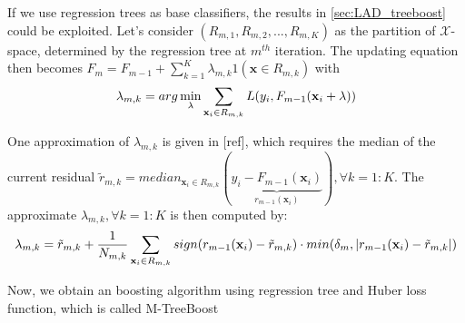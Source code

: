 \documentclass[a4paper,twoside,12pt]{article}
\begin{document}
If we use regression trees as base classifiers, the results in \ref{sec:LAD_treeboost} could be exploited. 
Let's consider $(R_{m,1}, R_{m,2},..., R_{m,K})$ as the partition of $\mathcal{X}$-space, determined by the regression tree at $m^{th}$ iteration. The updating equation then becomes $F_m = F_{m-1} + \sum\limits_{k=1}^{K}{\lambda_{m,k}1(\textbf{x}\in{R_{m,k}})}$ with
\begin{align}
	\lambda_{m,k} =arg\min\limits_{\lambda}\sum\limits_{\textbf{x}_i\in{R_{m,k}}}{L(y_i, F_{m-1}(\textbf{x}_i + \lambda))} \notag
\end{align}

One approximation of $\lambda_{m,k}$ is given in [ref], which requires the median of the current residual $\tilde{r}_{m,k} = median_{\textbf{x}_i\in{R_{m,k}}}(\underbrace{y_i - F_{m-1}(\textbf{x}_i)}_{r_{m-1}(\textbf{x}_i)}), \forall{k}=1:K$. The approximate $\lambda_{m,k}, \forall{k}=1:K$ is then computed by:
\begin{align}
	\lambda_{m,k} = \tilde{r}_{m,k} + \frac{1}{N_{m,k}}\sum_{\textbf{x}_i\in{R_{m,k}}}sign(r_{m-1}(\textbf{x}_i) - \tilde{r}_{m,k}) \cdot min(\delta_m, |r_{m-1}(\textbf{x}_i) - \tilde{r}_{m,k}|) \notag
\end{align}

Now, we obtain an boosting algorithm using regression tree and Huber loss function, which is called M-TreeBoost

\begin{center}
\end{center}
\end{document}

